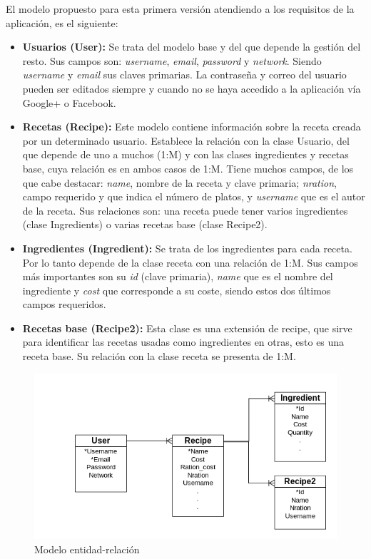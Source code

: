 El modelo propuesto para esta primera versión atendiendo a los requisitos de la aplicación, es el siguiente:
\begin{itemize}
	\item \textbf{Usuarios (User):} Se trata del modelo base y del que depende la gestión del resto. Sus campos son: \emph{username}, \emph{email}, \emph{password} y \emph{network}. Siendo \emph{username} y \emph{email} sus claves primarias. La contraseña y correo del usuario pueden ser editados siempre y cuando no se haya accedido a la aplicación vía Google+ o Facebook.

	\item \textbf{Recetas (Recipe):} Este modelo contiene información sobre la receta creada por un determinado usuario. Establece la relación con la clase Usuario, del que depende de uno a muchos (1:M) y con las clases ingredientes y recetas base, cuya relación es en ambos casos de 1:M. Tiene muchos campos, de los que cabe destacar: \emph{name}, nombre de la receta y clave primaria; \emph{nration}, campo requerido y que indica el número de platos, y \emph{username} que es el autor de la receta. 	Sus relaciones son: una receta puede tener varios ingredientes (clase Ingredients) o varias recetas base (clase Recipe2).

	\item \textbf{Ingredientes (Ingredient):} Se trata de los ingredientes para cada receta. Por lo tanto depende de la clase receta con una relación de 1:M. Sus campos más importantes son su \emph{id} (clave primaria), \emph{name} que es el nombre del ingrediente y \emph{cost} que corresponde a su coste, siendo estos dos últimos campos requeridos.

	\item \textbf{Recetas base (Recipe2):} Esta clase es una extensión de recipe, que sirve para identificar las recetas usadas como ingredientes en otras, esto es una receta base. Su relación con la clase receta se presenta de 1:M.

\end{itemize}

\begin{figure}[H]
	\centering
	\includegraphics[width=12cm]{./images/modelo_entidad_relacion.png}
	\caption{Modelo entidad-relación} \label{fig:modelo-entidad-relacion}
\end{figure}


